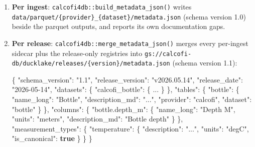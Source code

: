 \documentclass[
  letterpaper,
  DIV=11,
  numbers=noendperiod]{scrreprt}
\newenvironment{Shaded}{\begin{snugshade}}{\end{snugshade}}
\newcommand{\DataTypeTok}[1]{\textcolor[rgb]{0.68,0.00,0.00}{#1}}
\newcommand{\ErrorTok}[1]{\textcolor[rgb]{0.68,0.00,0.00}{#1}}
\newcommand{\FunctionTok}[1]{\textcolor[rgb]{0.28,0.35,0.67}{#1}}
\newcommand{\KeywordTok}[1]{\textcolor[rgb]{0.00,0.23,0.31}{\textbf{#1}}}
\newcommand{\StringTok}[1]{\textcolor[rgb]{0.13,0.47,0.30}{#1}}
\begin{document}
\begin{enumerate}
\def\labelenumi{\arabic{enumi}.}
\item
  \textbf{Per ingest}: \texttt{calcofi4db::build\_metadata\_json()}
  writes \texttt{data/parquet/\{provider\}\_\{dataset\}/metadata.json}
  (schema version 1.0) beside the parquet outputs, and reports its own
  documentation gaps.
\item
  \textbf{Per release}: \texttt{calcofi4db::merge\_metadata\_json()}
  merges every per-ingest sidecar plus the release-only registries into
  \texttt{gs://calcofi-db/ducklake/releases/\{version\}/metadata.json}
  (schema version 1.1):

\begin{Shaded}
\begin{Highlighting}[]
\FunctionTok{\{}
  \DataTypeTok{"schema\_version"}\FunctionTok{:} \StringTok{"1.1"}\FunctionTok{,}
  \DataTypeTok{"release\_version"}\FunctionTok{:} \StringTok{"v2026.05.14"}\FunctionTok{,}
  \DataTypeTok{"release\_date"}\FunctionTok{:}    \StringTok{"2026{-}05{-}14"}\FunctionTok{,}
  \DataTypeTok{"datasets"}\FunctionTok{:}          \FunctionTok{\{} \DataTypeTok{"calcofi\_bottle"}\FunctionTok{:} \FunctionTok{\{} \ErrorTok{...} \FunctionTok{\}} \FunctionTok{\},}
  \DataTypeTok{"tables"}\FunctionTok{:}            \FunctionTok{\{} \DataTypeTok{"bottle"}\FunctionTok{:}         \FunctionTok{\{} \DataTypeTok{"name\_long"}\FunctionTok{:} \StringTok{"Bottle"}\FunctionTok{,}
                                             \DataTypeTok{"description\_md"}\FunctionTok{:} \StringTok{"..."}\FunctionTok{,}
                                             \DataTypeTok{"provider"}\FunctionTok{:} \StringTok{"calcofi"}\FunctionTok{,}
                                             \DataTypeTok{"dataset"}\FunctionTok{:}  \StringTok{"bottle"} \FunctionTok{\}} \FunctionTok{\},}
  \DataTypeTok{"columns"}\FunctionTok{:}           \FunctionTok{\{} \DataTypeTok{"bottle.depth\_m"}\FunctionTok{:} \FunctionTok{\{} \DataTypeTok{"name\_long"}\FunctionTok{:} \StringTok{"Depth M"}\FunctionTok{,}
                                             \DataTypeTok{"units"}\FunctionTok{:}          \StringTok{"meters"}\FunctionTok{,}
                                             \DataTypeTok{"description\_md"}\FunctionTok{:} \StringTok{"Bottle depth"} \FunctionTok{\}} \FunctionTok{\},}
  \DataTypeTok{"measurement\_types"}\FunctionTok{:} \FunctionTok{\{} \DataTypeTok{"temperature"}\FunctionTok{:}    \FunctionTok{\{} \DataTypeTok{"description"}\FunctionTok{:} \StringTok{"..."}\FunctionTok{,}
                                             \DataTypeTok{"units"}\FunctionTok{:}       \StringTok{"degC"}\FunctionTok{,}
                                             \DataTypeTok{"is\_canonical"}\FunctionTok{:} \KeywordTok{true} \FunctionTok{\}} \FunctionTok{\}}
\FunctionTok{\}}
\end{Highlighting}
\end{Shaded}
\end{enumerate}
\end{document}
